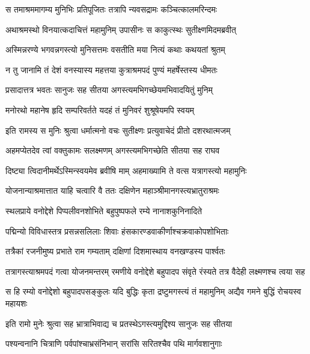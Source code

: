 \twolineshloka
{स तमाश्रममागम्य मुनिभिः प्रतिपूजितः}
{तत्रापि न्यवसद्रामः कञ्चित्कालमरिन्दमः} %

\twolineshloka
{अथाश्रमस्थो विनयात्कदाचित्तं महामुनिम्}
{उपासीनः स काकुत्स्थः सुतीक्ष्णमिदमब्रवीत्} %

\twolineshloka
{अस्मिन्नरण्ये भगवन्नगस्त्यो मुनिसत्तमः}
{वसतीति मया नित्यं कथाः कथयतां श्रुतम्} %

\twolineshloka
{न तु जानामि तं देशं वनस्यास्य महत्तया}
{कुत्राश्रमपदं पुण्यं महर्षेस्तस्य धीमतः} %

\twolineshloka
{प्रसादात्तत्र भवतः सानुजः सह सीतया}
{अगस्त्यमभिगच्छेयमभिवादयितुं मुनिम्} %

\twolineshloka
{मनोरथो महानेष हृदि सम्परिवर्तते}
{यदहं तं मुनिवरं शुश्रूषेयमपि स्वयम्} %

\twolineshloka
{इति रामस्य स मुनिः श्रुत्वा धर्मात्मनो वचः}
{सुतीक्ष्णः प्रत्युवाचेदं प्रीतो दशरथात्मजम्} %

\twolineshloka
{अहमप्येतदेव त्वां वक्तुकामः सलक्ष्मणम्}
{अगस्त्यमभिगच्छेति सीतया सह राघव} %

\twolineshloka
{दिष्ट्या त्विदानीमर्थेऽस्मिन्स्वयमेव ब्रवीषि माम्}
{अहमाख्यामि ते वत्स यत्रागस्त्यो महामुनिः} %

\twolineshloka
{योजनान्याश्रमात्तात याहि चत्वारि वै ततः}
{दक्षिणेन महाञ्श्रीमानगस्त्यभ्रातुराश्रमः} %

\twolineshloka
{स्थलप्राये वनोद्देशे पिप्पलीवनशोभिते}
{बहुपुष्पफले रम्ये नानाशकुनिनादिते} %

\twolineshloka
{पद्मिन्यो विविधास्तत्र प्रसन्नसलिलाः शिवाः}
{हंसकारण्डवाकीर्णाश्चक्रवाकोपशोभिताः} %

\twolineshloka
{तत्रैकां रजनीमुष्य प्रभाते राम गम्यताम्}
{दक्षिणां दिशमास्थाय वनखण्डस्य पार्श्वतः} %

\threelineshloka
{तत्रागस्त्याश्रमपदं गत्वा योजनमन्तरम्}
{रमणीये वनोद्देशे बहुपादप संवृते}
{रंस्यते तत्र वैदेही लक्ष्मणश्च त्वया सह} %

\threelineshloka
{स हि रम्यो वनोद्देशो बहुपादपसङ्कुलः}
{यदि बुद्धिः कृता द्रष्टुमगस्त्यं तं महामुनिम्}
{अद्यैव गमने बुद्धिं रोचयस्व महायशः} %

\twolineshloka
{इति रामो मुनेः श्रुत्वा सह भ्रात्राभिवाद्य च}
{प्रतस्थेऽगस्त्यमुद्दिश्य सानुजः सह सीतया} %

\twolineshloka
{पश्यन्वनानि चित्राणि पर्वपांश्चाभ्रसंनिभान्}
{सरांसि सरितश्चैव पथि मार्गवशानुगाः} %

